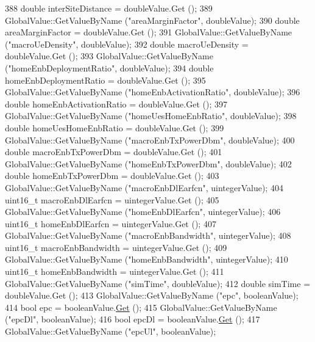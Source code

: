 \begin{DoxyCode}
388   \textcolor{keywordtype}{double} interSiteDistance = doubleValue.Get ();
389   GlobalValue::GetValueByName (\textcolor{stringliteral}{"areaMarginFactor"}, doubleValue);
390   \textcolor{keywordtype}{double} areaMarginFactor = doubleValue.Get ();
391   GlobalValue::GetValueByName (\textcolor{stringliteral}{"macroUeDensity"}, doubleValue);
392   \textcolor{keywordtype}{double} macroUeDensity = doubleValue.Get ();
393   GlobalValue::GetValueByName (\textcolor{stringliteral}{"homeEnbDeploymentRatio"}, doubleValue);
394   \textcolor{keywordtype}{double} homeEnbDeploymentRatio = doubleValue.Get ();
395   GlobalValue::GetValueByName (\textcolor{stringliteral}{"homeEnbActivationRatio"}, doubleValue);
396   \textcolor{keywordtype}{double} homeEnbActivationRatio = doubleValue.Get ();
397   GlobalValue::GetValueByName (\textcolor{stringliteral}{"homeUesHomeEnbRatio"}, doubleValue);
398   \textcolor{keywordtype}{double} homeUesHomeEnbRatio = doubleValue.Get ();
399   GlobalValue::GetValueByName (\textcolor{stringliteral}{"macroEnbTxPowerDbm"}, doubleValue);
400   \textcolor{keywordtype}{double} macroEnbTxPowerDbm = doubleValue.Get ();
401   GlobalValue::GetValueByName (\textcolor{stringliteral}{"homeEnbTxPowerDbm"}, doubleValue);
402   \textcolor{keywordtype}{double} homeEnbTxPowerDbm = doubleValue.Get ();
403   GlobalValue::GetValueByName (\textcolor{stringliteral}{"macroEnbDlEarfcn"}, uintegerValue);
404   uint16\_t macroEnbDlEarfcn = uintegerValue.Get ();
405   GlobalValue::GetValueByName (\textcolor{stringliteral}{"homeEnbDlEarfcn"}, uintegerValue);
406   uint16\_t homeEnbDlEarfcn = uintegerValue.Get ();
407   GlobalValue::GetValueByName (\textcolor{stringliteral}{"macroEnbBandwidth"}, uintegerValue);
408   uint16\_t macroEnbBandwidth = uintegerValue.Get ();
409   GlobalValue::GetValueByName (\textcolor{stringliteral}{"homeEnbBandwidth"}, uintegerValue);
410   uint16\_t homeEnbBandwidth = uintegerValue.Get ();
411   GlobalValue::GetValueByName (\textcolor{stringliteral}{"simTime"}, doubleValue);
412   \textcolor{keywordtype}{double} simTime = doubleValue.Get ();
413   GlobalValue::GetValueByName (\textcolor{stringliteral}{"epc"}, booleanValue);
414   \textcolor{keywordtype}{bool} epc = booleanValue.\hyperlink{classns3_1_1BooleanValue_a15d5d96abfd11676964f40859442ec12}{Get} ();
415   GlobalValue::GetValueByName (\textcolor{stringliteral}{"epcDl"}, booleanValue);
416   \textcolor{keywordtype}{bool} epcDl = booleanValue.\hyperlink{classns3_1_1BooleanValue_a15d5d96abfd11676964f40859442ec12}{Get} ();
417   GlobalValue::GetValueByName (\textcolor{stringliteral}{"epcUl"}, booleanValue);

\end{DoxyCode}
